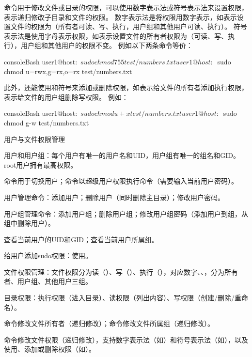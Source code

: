命令用于修改文件或目录的权限，可以使用数字表示法或符号表示法来设置权限，表示递归修改子目录和文件的权限。
数字表示法是将权限用数字表示，如表示设置文件的权限为（所有者可读、写、执行，用户组和其他用户可读、执行）。
符号表示法是使用字母表示权限，如表示设置文件的所有者权限为（可读、写、执行），用户组和其他用户的权限不变。
例如以下两条命令等价：
\begin{envcode}{console}{Bash}
user1@host:~$ sudo chmod 755 test/numbers.txt
user1@host:~$ sudo chmod u=rwx,g=rx,o=rx test/numbers.txt
\end{envcode}

此外，还能使用\code{+}和\code{-}符号来添加或删除权限，如表示给文件的所有者添加执行权限，表示给文件的用户组删除写权限。
例如：
\begin{envcode}{console}{Bash}
user1@host:~$ sudo chmod u+x test/numbers.txt
user1@host:~$ sudo chmod g-w test/numbers.txt
\end{envcode}

\begin{zj}
用户与文件权限管理

用户和用户组：每个用户有唯一的用户名和UID，用户组有唯一的组名和GID。root用户拥有最高权限。

命令用于切换用户；命令以超级用户权限执行命令（需要输入当前用户密码）。

用户管理命令：添加用户；删除用户（同时删除主目录）；修改用户密码。

用户组管理命令：添加用户组；删除用户组；修改用户组密码（添加用户到组，从组中删除用户）。

查看当前用户的UID和GID；查看当前用户所属组。

给用户添加sudo权限：使用。

文件权限管理：文件权限分为读（）、写（）、执行（），对应数字、、，分为所有者、用户组、其他用户三组。

目录权限：执行权限（进入目录）、读权限（列出内容）、写权限（创建/删除/重命名）。

命令修改文件所有者（递归修改）；命令修改文件所属组（递归修改）。

命令修改文件权限（递归修改），支持数字表示法（如）和符号表示法（如），以及使用\code{+}、\code{-}添加或删除权限（如）。
\end{zj}



